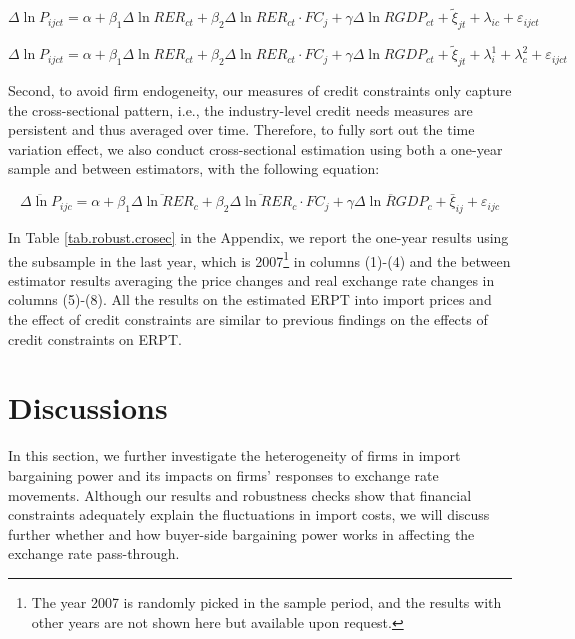 \begin{equation}
    \Delta \ln P_{ijct}=\alpha+\beta_{1} \Delta \ln RER_{ct}+\beta_{2} \Delta \ln RER_{ct} \cdot FC_{j}+\gamma \Delta \ln RGDP_{ct}+\tilde{\xi}_{jt}+\lambda_{ic}+\varepsilon_{ijct}
	\label{eq.credit.fe1}
\end{equation}

\begin{equation}
    \Delta \ln P_{ijct}=\alpha+\beta_{1} \Delta \ln RER_{ct}+\beta_{2} \Delta \ln RER_{ct} \cdot FC_{j}+\gamma \Delta \ln RGDP_{ct}+\tilde{\xi}_{jt}+\lambda^1_{i} + \lambda^2_{c} +\varepsilon_{ijct}
	\label{eq.credit.fe2}
\end{equation}

Second, to avoid firm endogeneity, our measures of credit constraints only capture the cross-sectional pattern, i.e., the industry-level credit needs measures are persistent and thus averaged over time. Therefore, to fully sort out the time variation effect, we also conduct cross-sectional estimation using both a one-year sample and between estimators, with the following equation:

\begin{equation}
	\overline{\Delta \ln P}_{ijc}=\alpha+\beta_{1} \overline{\Delta \ln RER}_{c}+\beta_{2} \overline{\Delta \ln RER}_{c} \cdot FC_{j}+\gamma \overline{\Delta \ln RGDP}_{c}+\bar{\xi}_{ij} +\varepsilon_{ijc}
	\label{eq.credit.crosec}
\end{equation}

In Table \ref{tab.robust.crosec} in the Appendix, we report the one-year results using the subsample in the last year, which is 2007\footnote{The year 2007 is randomly picked in the sample period, and the results with other years are not shown here but available upon request.} in columns (1)-(4) and the between estimator results averaging the price changes and real exchange rate changes in columns (5)-(8). All the results on the estimated ERPT into import prices and the effect of credit constraints are similar to previous findings on the effects of credit constraints on ERPT.

\section{Discussions} \label{Discussion}

In this section, we further investigate the heterogeneity of firms in import bargaining power and its impacts on firms’ responses to exchange rate movements. Although our results and robustness checks show that financial constraints adequately explain the fluctuations in import costs, we will discuss further whether and how buyer-side bargaining power works in affecting the exchange rate pass-through.

